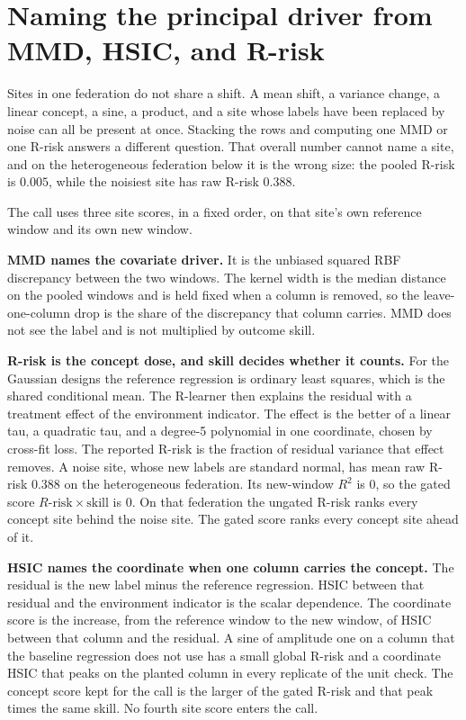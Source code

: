 \section{Naming the principal driver from MMD, HSIC, and R-risk}
\label{sec:kernel-drivers}

Sites in one federation do not share a shift.
A mean shift, a variance change, a linear concept, a sine, a product, and a site whose labels have been replaced by noise can all be present at once.
Stacking the rows and computing one MMD or one R-risk answers a different question.
That overall number cannot name a site, and on the heterogeneous federation below it is the wrong size: the pooled R-risk is \(0.005\), while the noisiest site has raw R-risk \(0.388\).

The call uses three site scores, in a fixed order, on that site's own reference window and its own new window.

\par\noindent\textbf{MMD names the covariate driver.}
It is the unbiased squared RBF discrepancy between the two windows.
The kernel width is the median distance on the pooled windows and is held fixed when a column is removed, so the leave-one-column drop is the share of the discrepancy that column carries.
MMD does not see the label and is not multiplied by outcome skill.

\par\noindent\textbf{R-risk is the concept dose, and skill decides whether it counts.}
For the Gaussian designs the reference regression is ordinary least squares, which is the shared conditional mean.
The R-learner then explains the residual with a treatment effect of the environment indicator.
The effect is the better of a linear tau, a quadratic tau, and a degree-5 polynomial in one coordinate, chosen by cross-fit loss.
The reported R-risk is the fraction of residual variance that effect removes.
A noise site, whose new labels are standard normal, has mean raw R-risk \(0.388\) on the heterogeneous federation.
Its new-window \(R^2\) is \(0\), so the gated score \(R\text{-risk}\times\mathrm{skill}\) is \(0\).
On that federation the ungated R-risk ranks every concept site behind the noise site.
The gated score ranks every concept site ahead of it.

\par\noindent\textbf{HSIC names the coordinate when one column carries the concept.}
The residual is the new label minus the reference regression.
HSIC between that residual and the environment indicator is the scalar dependence.
The coordinate score is the increase, from the reference window to the new window, of HSIC between that column and the residual.
A sine of amplitude one on a column that the baseline regression does not use has a small global R-risk and a coordinate HSIC that peaks on the planted column in every replicate of the unit check.
The concept score kept for the call is the larger of the gated R-risk and that peak times the same skill.
No fourth site score enters the call.

